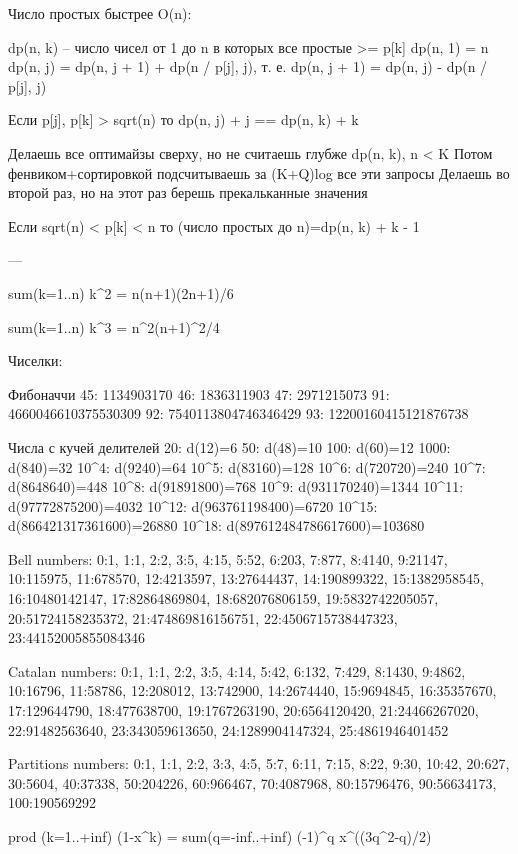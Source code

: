 Число простых быстрее O(n): 

dp(n, k) -- число чисел от 1 до n в которых все простые >= p[k]
dp(n, 1) = n
dp(n, j) = dp(n, j + 1) + dp(n / p[j], j), т. е. 
dp(n, j + 1) = dp(n, j) - dp(n / p[j], j)

Если p[j], p[k] > sqrt(n) то dp(n, j) + j == dp(n, k) + k

Делаешь все оптимайзы сверху, но не считаешь глубже dp(n, k), n < K
Потом фенвиком+сортировкой подсчитываешь за (K+Q)log все эти запросы
Делаешь во второй раз, но на этот раз берешь прекальканные значения

Если sqrt(n) < p[k] < n то (число простых до n)=dp(n, k) + k - 1

---

sum(k=1..n) k^2 = n(n+1)(2n+1)/6

sum(k=1..n) k^3 = n^2(n+1)^2/4


Чиселки: 

Фибоначчи
45:  1134903170
46:  1836311903
47:  2971215073
91:  4660046610375530309
92:  7540113804746346429
93:  12200160415121876738

Числа с кучей делителей
20: d(12)=6
50: d(48)=10
100: d(60)=12
1000: d(840)=32
10^4: d(9240)=64
10^5: d(83160)=128
10^6: d(720720)=240
10^7: d(8648640)=448
10^8: d(91891800)=768
10^9: d(931170240)=1344
10^{11}: d(97772875200)=4032
10^{12}: d(963761198400)=6720
10^{15}: d(866421317361600)=26880
10^{18}: d(897612484786617600)=103680

Bell numbers:
0:1, 1:1, 2:2, 3:5, 4:15, 5:52, 6:203, 7:877, 8:4140, 9:21147,
10:115975, 11:678570, 12:4213597, 13:27644437, 14:190899322,
15:1382958545, 16:10480142147, 17:82864869804, 18:682076806159,
19:5832742205057, 20:51724158235372, 21:474869816156751,
22:4506715738447323, 23:44152005855084346

Catalan numbers:
0:1, 1:1, 2:2, 3:5, 4:14, 5:42, 6:132, 7:429, 8:1430, 9:4862,
10:16796, 11:58786, 12:208012, 13:742900, 14:2674440,
15:9694845, 16:35357670, 17:129644790, 18:477638700,
19:1767263190, 20:6564120420, 21:24466267020, 22:91482563640,
23:343059613650, 24:1289904147324, 25:4861946401452

Partitions numbers:
0:1, 1:1, 2:2, 3:3, 4:5, 5:7, 6:11, 7:15, 8:22, 9:30, 10:42, 20:627, 30:5604, 40:37338, 50:204226, 60:966467, 70:4087968, 80:15796476, 90:56634173, 100:190569292

prod (k=1..+inf) (1-x^k) = sum(q=-inf..+inf) (-1)^q x^((3q^2-q)/2)